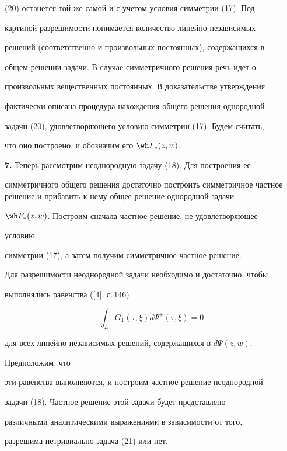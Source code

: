 (20) останется той же самой и с учетом условия симметрии (17). Под 


картиной разрешимости понимается количество линейно независимых 


решений (соответственно и произвольных постоянных), содержащихся в 


общем решении задачи. В случае симметричного решения речь идет о 


произвольных вещественных постоянных. В доказательстве утверждения 


фактически описана процедура нахождения общего решения однородной 


задачи (20), удовлетворяющего условию симметрии (17). Будем считать, 


что оно построено, и обозначим его $\wh F_*(z,w)$. 


\medskip 


 


{\bf 7.} Теперь рассмотрим неоднородную задачу (18). Для построения ее 


симметричного общего решения достаточно построить симметричное частное решение и прибавить к нему общее решение однородной задачи 


$\wh F_*(z,w)$. Построим сначала частное решение, не удовлетворяющее 


условию 


симметрии (17), а затем получим симметричное частное решение. 


 


Для разрешимости неоднородной задачи необходимо и достаточно, чтобы 


выполнялись равенства ([4], с.\,146) 


\begin{equation} 


\int_L G_1(\tau,\xi)d\Psi^+(\tau,\xi)=0 


\end{equation} 


для всех линейно независимых решений, содержащихся в $d\Psi(z,w)$. 


Предположим, что 


эти равенства выполняются, и построим частное решение неоднородной 


задачи (18). Частное решение этой задачи будет представлено 


различными аналитическими выражениями в зависимости от того, 


разрешима нетривиально задача (21) или нет. 


